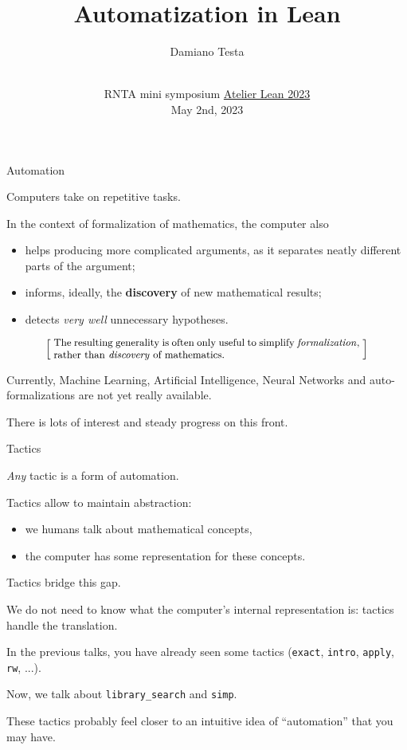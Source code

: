 \documentclass{beamer}
\title{Automatization in Lean}
\author{Damiano Testa}
\institute[]{University of Warwick}
\date[\href{http://www.rnta.eu/7MSRNTA/lean.html}{Atelier Lean 2023}]{\\
\vspace{50pt}
RNTA mini symposium
\href{http://www.rnta.eu/7MSRNTA/lean.html}{Atelier Lean 2023}\\
\vspace{20pt}
May 2nd, 2023
}
\begin{document}
\frame{\titlepage}

\begin{frame}[fragile]
{Automation}

Computers take on repetitive tasks.
\bigskip

In the context of formalization of mathematics, the computer also

\begin{itemize}
\item
  helps producing more complicated arguments, as it separates neatly different parts of the argument;
\item
  informs, ideally, the {\textbf{discovery}} of new mathematical results;
\item
  detects {\emph{very well}} unnecessary hypotheses.
\end{itemize}

\smallskip
\[
  \left[ \;
  \makebox{\parbox{0.8\textwidth}{\small
  The resulting generality is often only useful to simplify {\emph{formalization}}, rather than {\emph{discovery}} of mathematics.
  }}
  \; \right]
\]
\bigskip

Currently, Machine Learning, Artificial Intelligence, Neural Networks and auto-formalizations are not yet really available.
\bigskip

There is lots of interest and steady progress on this front.
\end{frame}

\begin{frame}[fragile]{Tactics}

{\emph{Any}} tactic is a form of automation.
\bigskip

Tactics allow to maintain abstraction:

\begin{itemize}
\item
  we humans talk about mathematical concepts,
\item
  the computer has some representation for these concepts.
\end{itemize}
\bigskip

Tactics bridge this gap.
\bigskip

We do not need to know what the computer's internal representation is: tactics handle the translation.
\end{frame}

\begin{frame}[fragile]

In the previous talks, you have already seen some tactics ({\verb`exact`}, {\verb`intro`}, {\verb`apply`}, {\verb`rw`}, ...).
\bigskip

Now, we talk about {\verb`library_search`} and {\verb`simp`}.
\bigskip

These tactics probably feel closer to an intuitive idea of ``automation'' that you may have.
\end{frame}
\end{document}
